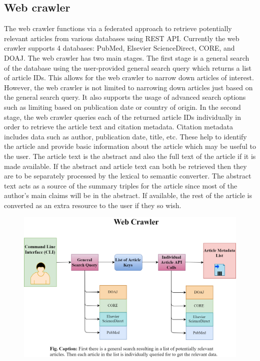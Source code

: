 \documentclass[12pt]{article}
\begin{document}
	\subsection{Web crawler}
	\quad The web crawler functions via a federated approach to retrieve potentially relevant articles from various databases using REST API. Currently the web crawler supports 4 databases: PubMed, Elsevier ScienceDirect, CORE, and DOAJ. \cite{knoth2012core} The web crawler has two main stages. 
	The first stage is a general search of the database using the user-provided general search query which returns a list of article IDs. This allows for the web crawler to narrow down articles of interest. However, the web crawler is not limited to narrowing down articles just based on the general search query. It also supports the usage of advanced search options such as limiting based on publication date or country of origin. 
	In the second stage, the web crawler queries each of the returned article IDs individually in order to retrieve the article text and citation metadata. Citation metadata includes data such as author, publication date, title, etc. These help to identify the article and provide basic information about the article which may be useful to the user. The article text is the abstract and also the full text of the article if it is made available. If the abstract and article text can both be retrieved then they are to be separately processed by the lexical to semantic converter. The abstract text acts as a source of the summary triples for the article since most of the author’s main claims will be in the abstract. If available, the rest of the article is converted as an extra resource to the user if they so wish. 
	\begin{figure}[h!]
		\centering
		\includegraphics[scale=0.25]{Webcrawler_vJSHS1.0}
	\end{figure}
\end{document}
